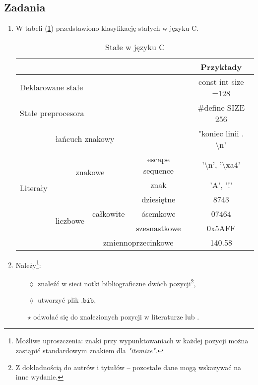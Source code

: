 \documentclass[a4paper, 11pt]{article}
\begin{document}
\subsection{Zadania}
\begin{enumerate}
\item {W tabeli (\ref{tab}) przedstawiono klasyfikację stałych w języku C.

\begin{table}[!h]
\caption{Stałe w języku C}
\label{tab}
\begin{center}
\begin{tabular}{|c|c|c|c|c|}

\cline{5-5}
\multicolumn{4}{l|}{}&Przykłady \\
\hline
\multicolumn{4}{|l|}{Deklarowane stałe} & const int size =128 \\
\hline
\multicolumn{4}{|l|}{Stałe preprocesora} & \#define SIZE 256 \\
\hline
\multirow{7}{*}{Literały} & \multicolumn{3}{|l|}{łańcuch znakowy} & "koniec linii . \textbackslash n" \\

 \cline{2-5}& \multicolumn{2}{c|}{\multirow{2}{*}{znakowe}} & escape sequence & '\textbackslash n', '\textbackslash xa4'\\
\cline{4-5} &&& znak & 'A', '!'\\  

\cline{2-5}&\multirow{4}{*}{liczbowe}&\multirow{3}{*}{całkowite}& dziesiętne & 8743 \\
\cline{4-5}&&&ósemkowe&07464 \\
\cline{4-5}&&&szesnastkowe&0x5AFF \\
\cline{3-5}&&\multicolumn{2}{|c|}{zmiennoprzecinkowe}& 140.58\\

\hline
\end{tabular}
\end{center}
\end{table}

}
\item {Należy\footnote{Możliwe uproszczenia: znaki przy wypunktowaniach w każdej pozycji można zastąpić standardowym znakiem dla {\em"itemize".}}:

\begin{itemize}
\item[$\lozenge$] {znaleźć w sieci notki bibliograficzne dwóch pozycji\footnote{Z dokładnością do autrów i tytułów -- pozostałe dane mogą wskazywać na inne wydanie.},
}
\item[$\lozenge$] {utworzyć plik $\mathtt{.bib}$,}
\item[$\star$] {
odwołać się do znalezionych pozycji w literaturze \cite{kahneman2011thinking} lub \cite{kernighan2006c}.
}
\end{itemize}
}
\end{enumerate}

%
\end{document}
